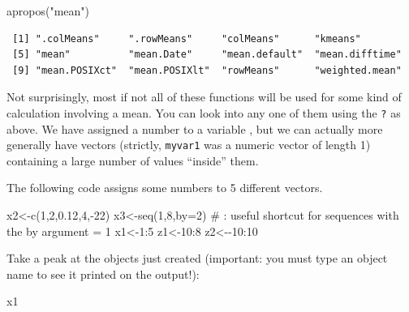 \documentclass[
  letterpaper,
  DIV=11,
  numbers=noendperiod]{scrartcl}
\newenvironment{Shaded}{\begin{snugshade}}{\end{snugshade}}
\newcommand{\AttributeTok}[1]{\textcolor[rgb]{0.40,0.45,0.13}{#1}}
\newcommand{\CommentTok}[1]{\textcolor[rgb]{0.37,0.37,0.37}{#1}}
\newcommand{\DecValTok}[1]{\textcolor[rgb]{0.68,0.00,0.00}{#1}}
\newcommand{\FloatTok}[1]{\textcolor[rgb]{0.68,0.00,0.00}{#1}}
\newcommand{\FunctionTok}[1]{\textcolor[rgb]{0.28,0.35,0.67}{#1}}
\newcommand{\NormalTok}[1]{\textcolor[rgb]{0.00,0.23,0.31}{#1}}
\newcommand{\OtherTok}[1]{\textcolor[rgb]{0.00,0.23,0.31}{#1}}
\newcommand{\SpecialCharTok}[1]{\textcolor[rgb]{0.37,0.37,0.37}{#1}}
\newcommand{\StringTok}[1]{\textcolor[rgb]{0.13,0.47,0.30}{#1}}
\begin{document}
\begin{Shaded}
\begin{Highlighting}[]
\FunctionTok{apropos}\NormalTok{(}\StringTok{"mean"}\NormalTok{)}
\end{Highlighting}
\end{Shaded}

\begin{verbatim}
 [1] ".colMeans"     ".rowMeans"     "colMeans"      "kmeans"       
 [5] "mean"          "mean.Date"     "mean.default"  "mean.difftime"
 [9] "mean.POSIXct"  "mean.POSIXlt"  "rowMeans"      "weighted.mean"
\end{verbatim}

Not surprisingly, most if not all of these functions will be used for
some kind of calculation involving a mean. You can look into any one of
them using the \texttt{?} as above. We have assigned a number to a
variable , but we can actually more generally have vectors (strictly,
\texttt{myvar1} was a numeric vector of length 1) containing a large
number of values ``inside'' them.

The following code assigns some numbers to 5 different vectors.

\begin{Shaded}
\begin{Highlighting}[]
\NormalTok{x2}\OtherTok{\textless{}{-}}\FunctionTok{c}\NormalTok{(}\DecValTok{1}\NormalTok{,}\DecValTok{2}\NormalTok{,}\FloatTok{0.12}\NormalTok{,}\DecValTok{4}\NormalTok{,}\SpecialCharTok{{-}}\DecValTok{22}\NormalTok{)}
\NormalTok{x3}\OtherTok{\textless{}{-}}\FunctionTok{seq}\NormalTok{(}\DecValTok{1}\NormalTok{,}\DecValTok{8}\NormalTok{,}\AttributeTok{by=}\DecValTok{2}\NormalTok{)}
\CommentTok{\# : useful shortcut for sequences with the by argument = 1}
\NormalTok{x1}\OtherTok{\textless{}{-}}\DecValTok{1}\SpecialCharTok{:}\DecValTok{5}
\NormalTok{z1}\OtherTok{\textless{}{-}}\DecValTok{10}\SpecialCharTok{:}\DecValTok{8}
\NormalTok{z2}\OtherTok{\textless{}{-}}\SpecialCharTok{{-}}\DecValTok{10}\SpecialCharTok{:}\DecValTok{10}
\end{Highlighting}
\end{Shaded}

Take a peak at the objects just created (important: you must type an
object name to see it printed on the output!):

\begin{Shaded}
\begin{Highlighting}[]
\NormalTok{x1}
\end{Highlighting}
\end{Shaded}
\end{document}
